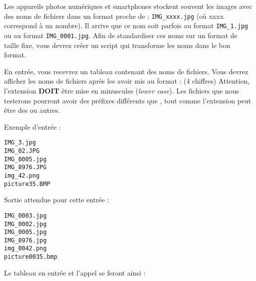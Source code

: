 

\vspace*{0.7cm}

\noindent {}

\bigskip

\noindent Les appareils photos numériques et smartphones stockent souvent les images avec des noms de fichiers dans un format proche de : \texttt{IMG\_xxxx.jpg} (où xxxx correspond à un nombre).
Il arrive que ce nom soit parfois au format \texttt{IMG\_1.jpg} ou au format \texttt{IMG\_0001.jpg}.
Afin de standardiser ces noms sur un format de taille fixe, vous devrez créer un script qui transforme les noms dans le bon format.

\bigskip

\noindent En entrée, vous recevrez un tableau contenant des noms de fichiers.
Vous devrez afficher les noms de fichiers après les avoir mis au format :  (4 chiffres)
Attention, l'extension \textbf{DOIT} être mise en minuscules (\textit{lower case}).
Les fichiers que nous testerons pourront avoir des préfixes différents que , tout comme l'extension peut être des  ou autres.

\bigskip

\noindent Exemple d'entrée :

\lstset{language=sh}
\begin{lstlisting}[frame=single,title={Exemple de données en entrée}]
IMG_3.jpg
IMG_02.JPG
IMG_0005.jpg
IMG_8976.JPG
img_42.png
picture35.BMP
\end{lstlisting}

\bigskip

\noindent Sortie attendue pour cette entrée :

\lstset{language=sh}
\begin{lstlisting}[frame=single,title={Sortie attendue pour l'entrée précédente}]
IMG_0003.jpg
IMG_0002.jpg
IMG_0005.jpg
IMG_8976.jpg
img_0042.png
picture0035.bmp
\end{lstlisting}

\bigskip

\noindent Le tableau en entrée et l'appel se feront ainsi : \\

